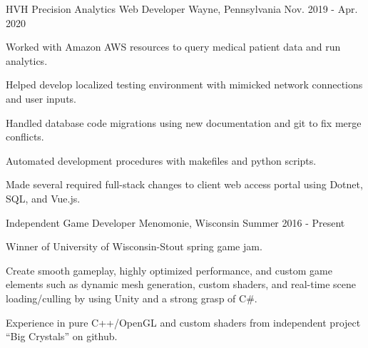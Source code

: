 

\begin{cventries}

  \cventry
    {HVH Precision Analytics} %
    {Web Developer} %
    {Wayne, Pennsylvania} %
    {Nov. 2019 - Apr. 2020} %
    {
      \begin{cvitems} %
        \item {Worked with Amazon AWS resources to query medical patient data and run analytics.}
        \item {Helped develop localized testing environment with mimicked network connections and user inputs.}
        \item {Handled database code migrations using new documentation and git to fix merge conflicts.}
        \item {Automated development procedures with makefiles and python scripts.}
        \item {Made several required full-stack changes to client web access portal using Dotnet, SQL, and Vue.js.}
      \end{cvitems}
    }

  \cventry
    {Independent} %
    {Game Developer} %
    {Menomonie, Wisconsin} %
    {Summer 2016 - Present} %
    {
      \begin{cvitems} %
        \item {Winner of University of Wisconsin-Stout spring game jam.}
        \item {Create smooth gameplay, highly optimized performance, and custom game elements such as dynamic mesh generation, custom shaders, and real-time scene loading/culling by using Unity and a strong grasp of C\#.}
        \item {Experience in pure C++/OpenGL and custom shaders from independent project ``Big Crystals'' on github.}
      \end{cvitems}
    }


\end{cventries}
